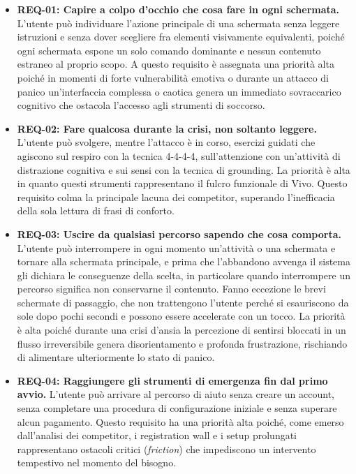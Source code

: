 \begin{itemize}
    \item \textbf{REQ-01: Capire a colpo d'occhio che cosa fare in ogni schermata.} L'utente può individuare l'azione principale di una schermata senza leggere istruzioni e senza dover scegliere fra elementi visivamente equivalenti, poiché ogni schermata espone un solo comando dominante e nessun contenuto estraneo al proprio scopo. A questo requisito è assegnata una priorità alta poiché in momenti di forte vulnerabilità emotiva o durante un attacco di panico un'interfaccia complessa o caotica genera un immediato sovraccarico cognitivo che ostacola l'accesso agli strumenti di soccorso.

    \item \textbf{REQ-02: Fare qualcosa durante la crisi, non soltanto leggere.} L'utente può svolgere, mentre l'attacco è in corso, esercizi guidati che agiscono sul respiro con la tecnica 4-4-4-4, sull'attenzione con un'attività di distrazione cognitiva e sui sensi con la tecnica di grounding. La priorità è alta in quanto questi strumenti rappresentano il fulcro funzionale di Vivo. Questo requisito colma la principale lacuna dei competitor, superando l'inefficacia della sola lettura di frasi di conforto.

    \item \textbf{REQ-03: Uscire da qualsiasi percorso sapendo che cosa comporta.} L'utente può interrompere in ogni momento un'attività o una schermata e tornare alla schermata principale, e prima che l'abbandono avvenga il sistema gli dichiara le conseguenze della scelta, in particolare quando interrompere un percorso significa non conservarne il contenuto. Fanno eccezione le brevi schermate di passaggio, che non trattengono l'utente perché si esauriscono da sole dopo pochi secondi e possono essere accelerate con un tocco. La priorità è alta poiché durante una crisi d'ansia la percezione di sentirsi bloccati in un flusso irreversibile genera disorientamento e profonda frustrazione, rischiando di alimentare ulteriormente lo stato di panico.

    \item \textbf{REQ-04: Raggiungere gli strumenti di emergenza fin dal primo avvio.} L'utente può arrivare al percorso di aiuto senza creare un account, senza completare una procedura di configurazione iniziale e senza superare alcun pagamento. Questo requisito ha una priorità alta poiché, come emerso dall'analisi dei competitor, i registration wall e i setup prolungati rappresentano ostacoli critici (\textit{friction}) che impediscono un intervento tempestivo nel momento del bisogno.


\end{itemize}
